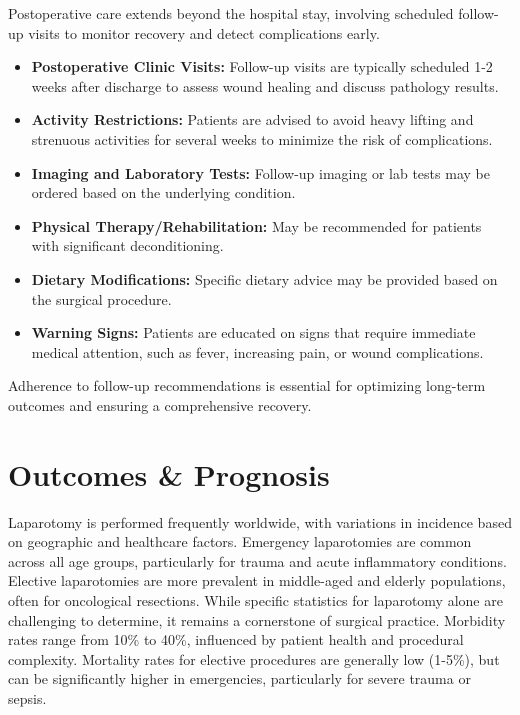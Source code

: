 Postoperative care extends beyond the hospital stay, involving scheduled follow-up visits to monitor recovery and detect complications early.

\begin{itemize}
  \item \textbf{Postoperative Clinic Visits:} Follow-up visits are typically scheduled 1-2 weeks after discharge to assess wound healing and discuss pathology results.

  \item \textbf{Activity Restrictions:} Patients are advised to avoid heavy lifting and strenuous activities for several weeks to minimize the risk of complications.

  \item \textbf{Imaging and Laboratory Tests:} Follow-up imaging or lab tests may be ordered based on the underlying condition.

  \item \textbf{Physical Therapy/Rehabilitation:} May be recommended for patients with significant deconditioning.

  \item \textbf{Dietary Modifications:} Specific dietary advice may be provided based on the surgical procedure.

  \item \textbf{Warning Signs:} Patients are educated on signs that require immediate medical attention, such as fever, increasing pain, or wound complications.
\end{itemize}

Adherence to follow-up recommendations is essential for optimizing long-term outcomes and ensuring a comprehensive recovery.

\section*{Outcomes \& Prognosis}
Laparotomy is performed frequently worldwide, with variations in incidence based on geographic and healthcare factors. Emergency laparotomies are common across all age groups, particularly for trauma and acute inflammatory conditions. Elective laparotomies are more prevalent in middle-aged and elderly populations, often for oncological resections. While specific statistics for laparotomy alone are challenging to determine, it remains a cornerstone of surgical practice. Morbidity rates range from 10\% to 40\%, influenced by patient health and procedural complexity. Mortality rates for elective procedures are generally low (1-5\%), but can be significantly higher in emergencies, particularly for severe trauma or sepsis.

